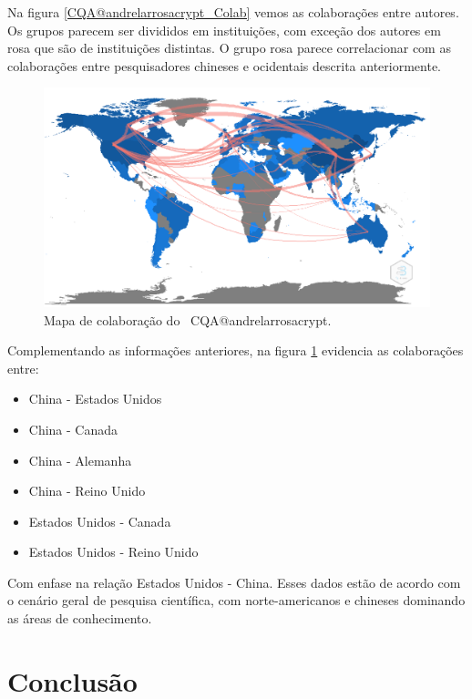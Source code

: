 Na figura \ref{CQA@andrelarrosacrypt_Colab} vemos as colaborações entre autores. Os grupos parecem ser divididos em instituições, com exceção dos autores em rosa que são de instituições distintas. O grupo rosa parece correlacionar com as colaborações entre pesquisadores chineses e ocidentais descrita anteriormente.

\begin{figure}
    \centering
    \includegraphics[angle=0,width=1\textwidth]{experiments/andrelarrosacrypt/AnaliseBibliometrica/CriptografiaQuantica/imagens/CQA@andrelarrosacrypt_ColabMap.png}
    \caption{Mapa de colaboração do \dataset\ CQA@andrelarrosacrypt.}
    \label{CQA@andrelarrosacrypt_ColabMap}
\end{figure}

Complementando as informações anteriores, na figura \ref{CQA@andrelarrosacrypt_ColabMap} evidencia as colaborações entre:

\begin{itemize}
    \item China - Estados Unidos
    \item China - Canada
    \item China - Alemanha
    \item China - Reino Unido
    \item Estados Unidos - Canada
    \item Estados Unidos - Reino Unido
\end{itemize}

Com enfase na relação Estados Unidos - China. Esses dados estão de acordo com o cenário geral de pesquisa científica, com norte-americanos e chineses dominando as áreas de conhecimento.

\section{Conclusão}

